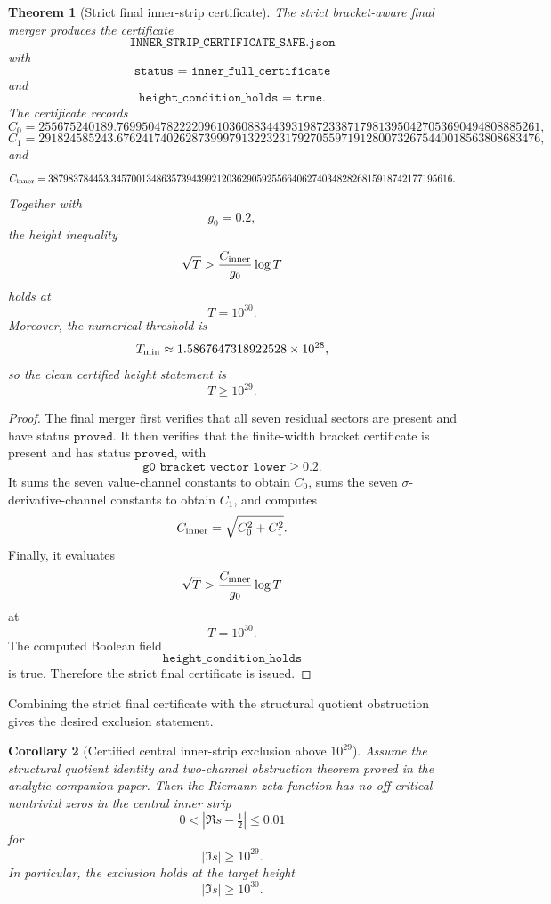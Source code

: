 \documentclass[11pt]{article}
\newtheorem{theorem}{Theorem}[section]
\newtheorem{corollary}[theorem]{Corollary}
\newcommand{\sig}{\sigma}
\newcommand{\Czero}{C_0}
\newcommand{\Cone}{C_1}
\newcommand{\Cinner}{C_{\rm inner}}
\newcommand{\gzero}{g_0}
\newcommand{\JSON}[1]{\texttt{#1}}
\newcommand{\code}[1]{\texttt{#1}}
\begin{document}
\begin{theorem}[Strict final inner-strip certificate]
The strict bracket-aware final merger produces the certificate
\[
        \code{INNER\_STRIP\_CERTIFICATE\_SAFE.json}
\]
with
\[
        \JSON{status = inner\_full\_certificate}
\]
and
\[
        \JSON{height\_condition\_holds = true}.
\]
The certificate records
\[
        \Czero
        =
        255675240189.76995047822220961036088344393198723387179813950427053690494808885261,
\]
\[
        \Cone
        =
        291824585243.67624174026287399979132232317927055971912800732675440018563808683476,
\]
and
\[
        \Cinner
        =
        387983784453.34570013486357394399212036290592556640627403482826815918742177195616.
\]
Together with
\[
        \gzero=0.2,
\]
the height inequality
\[
        \sqrt T>
        \frac{\Cinner}{\gzero}\log T
\]
holds at
\[
        T=10^{30}.
\]
Moreover, the numerical threshold is
\[
        T_{\rm min}
        \approx
        1.5867647318922528\times10^{28},
\]
so the clean certified height statement is
\[
        T\ge10^{29}.
\]
\end{theorem}

\begin{proof}
The final merger first verifies that all seven residual sectors are present and
have status \(\JSON{proved}\).  It then verifies that the finite-width bracket
certificate is present and has status \(\JSON{proved}\), with
\[
        \JSON{g0\_bracket\_vector\_lower}\ge0.2.
\]
It sums the seven value-channel constants to obtain \(\Czero\), sums the seven
\(\sig\)-derivative-channel constants to obtain \(\Cone\), and computes
\[
        \Cinner=\sqrt{\Czero^2+\Cone^2}.
\]
Finally, it evaluates
\[
        \sqrt T>
        \frac{\Cinner}{\gzero}\log T
\]
at
\[
        T=10^{30}.
\]
The computed Boolean field
\[
        \JSON{height\_condition\_holds}
\]
is true.  Therefore the strict final certificate is issued.
\end{proof}

Combining the strict final certificate with the structural quotient obstruction
gives the desired exclusion statement.

\begin{corollary}[Certified central inner-strip exclusion above \(10^{29}\)]
Assume the structural quotient identity and two-channel obstruction theorem
proved in the analytic companion paper.  Then the Riemann zeta function has no
off-critical nontrivial zeros in the central inner strip
\[
        0<|\Re s-\tfrac12|\le0.01
\]
for
\[
        |\Im s|\ge10^{29}.
\]
In particular, the exclusion holds at the target height
\[
        |\Im s|\ge10^{30}.
\]
\end{corollary}
\end{document}
